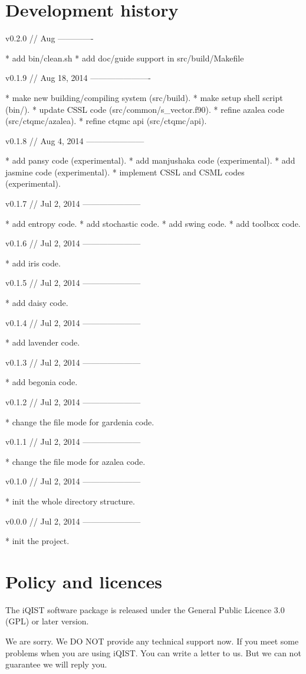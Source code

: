 \section{Development history}

v0.2.0 // Aug
-------------

* add bin/clean.sh
* add doc/guide support in src/build/Makefile


v0.1.9 // Aug 18, 2014
----------------------

* make new building/compiling system (src/build).
* make setup shell script (bin/).
* update CSSL code (src/common/s\_vector.f90).
* refine azalea code (src/ctqmc/azalea).
* refine ctqmc api (src/ctqmc/api).


v0.1.8 // Aug 4, 2014
---------------------

* add pansy code (experimental).
* add manjushaka code (experimental).
* add jasmine code (experimental).
* implement CSSL and CSML codes (experimental).


v0.1.7 // Jul 2, 2014
---------------------

* add entropy code.
* add stochastic code.
* add swing code.
* add toolbox code.


v0.1.6 // Jul 2, 2014
---------------------

* add iris code.


v0.1.5 // Jul 2, 2014
---------------------

* add daisy code.


v0.1.4 // Jul 2, 2014
---------------------

* add lavender code.


v0.1.3 // Jul 2, 2014
---------------------

* add begonia code.


v0.1.2 // Jul 2, 2014
---------------------

* change the file mode for gardenia code.


v0.1.1 // Jul 2, 2014
---------------------

* change the file mode for azalea code.


v0.1.0 // Jul 2, 2014
---------------------

* init the whole directory structure.


v0.0.0 // Jul 2, 2014
---------------------

* init the project.


\section{Policy and licences}

The iQIST software package is released under the General Public Licence
 3.0 (GPL) or later version.

We are sorry. We DO NOT provide any technical support now. If you meet
some problems when you are using iQIST. You can write a letter to us. But
we can not guarantee we will reply you.
